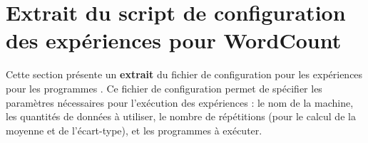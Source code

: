 \chapter{Extrait du script de configuration des expériences pour {WordCount}}

\label{ExperiencesPreliminairesWordCount.ann}

Cette section pr\'esente un \textbf{extrait} du fichier de
configuration pour les expériences pour les programmes
. Ce fichier de configuration permet de sp\'ecifier les
param\`etres nécessaires pour l'ex\'ecution des exp\'eriences : le nom
de la machine, les quantit\'es de donn\'ees à utiliser, le nombre de
r\'ep\'etitions (pour le calcul de la moyenne et de l'écart-type), et
les programmes \`a ex\'ecuter.


\newpage






